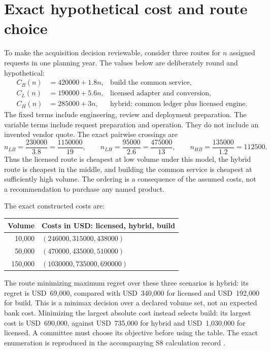 

\section{Exact hypothetical cost and route choice}
\label{exec17:s8-cost}

To make the acquisition decision reviewable, consider three routes for $n$
assigned requests in one planning year. The values below are deliberately
round and hypothetical:
\begin{align}
 C_B(n)&=420000+1.8n, &\text{build the common service},\\
 C_L(n)&=190000+5.6n, &\text{licensed adapter and conversion},\\
 C_H(n)&=285000+3n, &\text{hybrid: common ledger plus licensed engine}.
 \label{exec17:s8-costs}
\end{align}
The fixed terms include engineering, review and deployment preparation. The
variable terms include request preparation and operation. They do not include
an invented vendor quote. The exact pairwise crossings are
\begin{equation}
 n_{LB}=\frac{230000}{3.8}=\frac{1150000}{19},\qquad
 n_{LH}=\frac{95000}{2.6}=\frac{475000}{13},\qquad
 n_{HB}=\frac{135000}{1.2}=112500.
 \label{exec17:s8-crossings}
\end{equation}
Thus the licensed route is cheapest at low volume under this model, the
hybrid route is cheapest in the middle, and building the common service is
cheapest at sufficiently high volume. The ordering is a consequence of the
assumed costs, not a recommendation to purchase any named product.

The exact constructed costs are:
\begin{center}
\begin{tabular}{r l}
\toprule
Volume & Costs in USD: licensed, hybrid, build\\
\midrule
10,000 & $(246000,315000,438000)$\\
50,000 & $(470000,435000,510000)$\\
150,000 & $(1030000,735000,690000)$\\
\bottomrule
\end{tabular}
\end{center}
The route minimizing maximum regret over these three scenarios is hybrid:
its regret is USD~69,000, compared with USD~340,000 for licensed and USD~192,000 for
build. This is a minimax decision over a declared volume set, not an expected
bank cost. Minimizing the largest absolute cost instead selects build: its
largest cost is USD~690,000, against USD~735,000 for hybrid and USD~1,030,000
for licensed. A committee must choose its objective before using the table.
The exact enumeration is reproduced in the accompanying S8 calculation record
\citep{exec17_s8_examples}.

